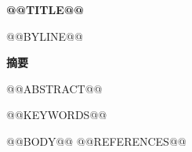 \documentclass[a4paper,11pt]{article}
\begin{document}
{\noindent\fontsize{22}{30}\selectfont\bfseries @@TITLE@@\par}
{\small @@BYLINE@@\par}
\vspace{0.35em}
{\bfseries 摘要}\par
@@ABSTRACT@@
\par{\small @@KEYWORDS@@}\par
@@BODY@@
@@REFERENCES@@
\end{document}
